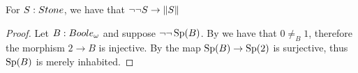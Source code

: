 \begin{corollary}\label{LemSurjectionsFormalToCompleteness}
 For $S:\Stone$, we have that $\neg \neg S \to  \lVert S \rVert$
\end{corollary}
\begin{proof}
  Let $B:\Boole$ and suppose $\neg \neg \operatorname{Sp}(B)$. By  we have that $0\not=_B1$, therefore the morphism $2\to B$ is injective. By  the map $\operatorname{Sp}(B) \to \operatorname{Sp}(2)$ is surjective, thus $\operatorname{Sp}(B)$ is merely inhabited. 
\end{proof} 




